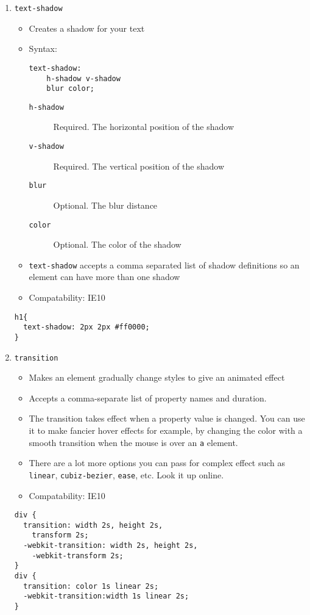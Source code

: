 \documentclass[10pt, twocolumn]{article}
\begin{document}
\begin{enumerate}
\item \texttt{text-shadow}
\begin{itemize}
\item Creates a shadow for your text
\item Syntax:
\begin{lstlisting}[frame=single]
text-shadow: 
    h-shadow v-shadow 
    blur color;
\end{lstlisting}
\begin{description}
\item[\texttt{h-shadow}] Required.  The horizontal position of the shadow
\item[\texttt{v-shadow}] Required.  The vertical position of the shadow
\item[\texttt{blur}] Optional.  The blur distance
\item[\texttt{color}] Optional.  The color of the shadow
\end{description}
\item \texttt{text-shadow} accepts a comma separated list of shadow definitions so an element can have more than one shadow
\item Compatability: IE10
\end{itemize}
\begin{lstlisting}[frame=single]
h1{
  text-shadow: 2px 2px #ff0000;
}
\end{lstlisting}
\item \texttt{transition}
\begin{itemize}
\item Makes an element gradually change styles to give an animated effect
\item Accepts a comma-separate list of property names and duration.
\item The transition takes effect when a property value is changed.  You can use it to make fancier hover effects for example, by changing the color with a smooth transition when the mouse is over an \texttt{a} element.
\item There are a lot more options you can pass for complex effect such as \texttt{linear}, \texttt{cubiz-bezier}, \texttt{ease}, etc.  Look it up online.
\item Compatability: IE10
\end{itemize}
\begin{lstlisting}[frame=single]
div {
  transition: width 2s, height 2s,
    transform 2s;
  -webkit-transition: width 2s, height 2s, 
    -webkit-transform 2s;
}
div {
  transition: color 1s linear 2s;
  -webkit-transition:width 1s linear 2s;
}
\end{lstlisting}
\end{enumerate}
\end{document}
